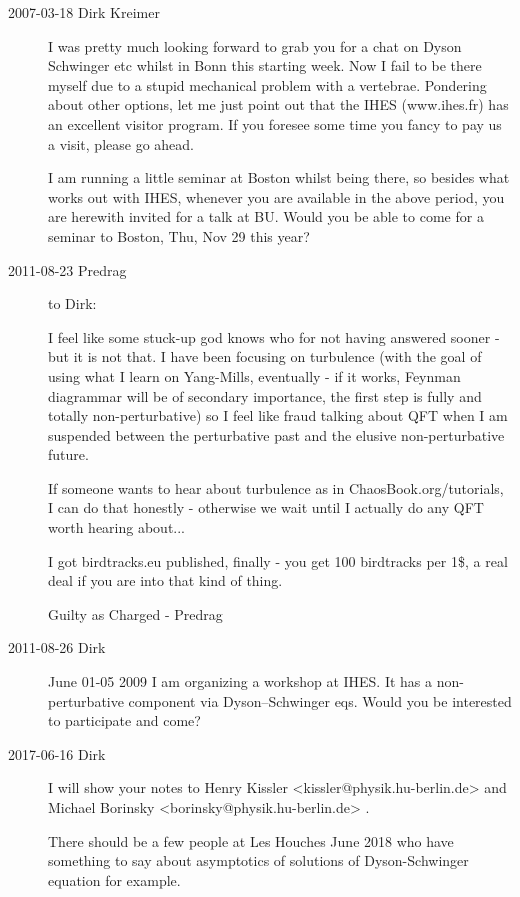 \begin{description}

\item[2007-03-18 Dirk Kreimer] %
I was pretty much looking forward to grab you for a chat on Dyson
Schwinger etc whilst in Bonn this starting week. Now I fail to be there
myself due to a stupid mechanical problem with a vertebrae.
Pondering about other options, let me just point out that the IHES
(www.ihes.fr) has an excellent visitor program. If you foresee some time
you fancy to pay us a visit, please go ahead.

I am running a little seminar at Boston whilst being there, so besides
what works out with IHES,  whenever you are available in the above
period, you are herewith invited for a talk at BU.
Would you be able to come for a seminar to Boston, Thu, Nov 29 this year?

\item[2011-08-23 Predrag] to Dirk:

I feel like some stuck-up god knows who for not having answered sooner -
but it is not that. I have been focusing on turbulence (with the goal of
using what I learn on Yang-Mills, eventually - if it works, Feynman
diagrammar will be of secondary importance, the first step is fully and
totally non-perturbative) so I feel like fraud talking about QFT when I
am suspended between the perturbative past and the elusive
non-perturbative future.

If someone wants to hear about turbulence as in
 {ChaosBook.org/tutorials}, I can do
that honestly - otherwise we wait until I actually do any QFT worth
hearing about...

I got  {birdtracks.eu} published, finally -
you get 100 birdtracks per 1\$, a real deal if you are into that kind of
thing.

Guilty as Charged -
Predrag

\item[2011-08-26 Dirk]
June 01-05 2009 I am organizing a workshop at IHES. It has a
non-perturbative component via Dyson--Schwinger eqs. Would you be
interested to participate and come?

\item[2017-06-16 Dirk]
I will show your notes to
Henry Kissler   <kissler@physik.hu-berlin.de>
and
{Michael Borinsky}    <borinsky@physik.hu-berlin.de> .

There should be a few people at Les Houches June 2018 who have something
to say about asymptotics of solutions of Dyson-Schwinger equation for
example.


\end{description}

